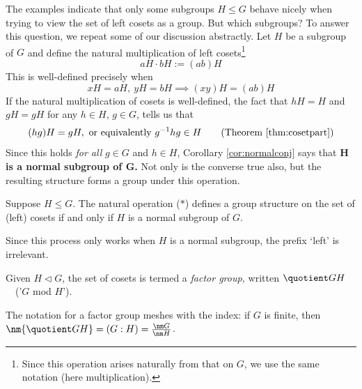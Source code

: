 
The examples indicate that only some subgroups $H\le G$ behave nicely when trying to view the set of left cosets as a group. But which subgroups? To answer this question, we repeat some of our discussion abstractly. Let $H$ be a subgroup of $G$ and define the natural multiplication of left cosets\footnote{Since this operation arises naturally from that on $G$, we use the same notation (here multiplication).}
\[
	aH\cdot bH:=(ab)H \tag{$\ast$}
\]
This is well-defined precisely when
\[
	xH=aH,\ yH=bH \implies (xy)H=(ab)H \tag{$\dag$}
\]
If the natural multiplication of cosets is well-defined, the fact that $hH=H$ and $gH=gH$ for any $h\in H$, $g\in G$, tells us that
\[
 	(hg)H=gH,\text{ or equivalently }	g^{-1}hg\in H \tag{Theorem \ref{thm:cosetpart}}
\]
Since this holds \emph{for all} $g\in G$ and $h\in H$, Corollary \ref{cor:normalconj} says that \textbf{$\boldsymbol{H}$ is a normal subgroup of $\boldsymbol G$.} Not only is the converse true also, but the resulting structure forms a group under this operation.

\begin{thm}{}{}
	Suppose $H\le G$. The natural operation ($\ast$) defines a group structure on the set of (left) cosets if and only if $H$ is a normal subgroup of $G$.
\end{thm}

Since this process only works when $H$ is a normal subgroup, the prefix `left' is irrelevant.

\begin{defn}{}{}
	Given $H\triangleleft G$, the set of cosets is termed a \emph{factor group,} written $\quotient GH$ \ \ ('$G$ mod $H$').
\end{defn}

The notation for a factor group meshes with the index: if $G$ is finite, then $\nm{\quotient GH}=(G:H)=\frac{\nm G}{\nm H}$.



